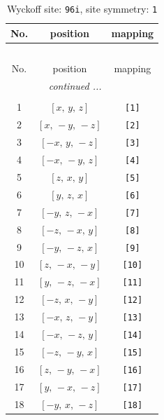 \documentclass[fleqn,8pt]{jsarticle}
\begin{document}
\begin{longtable}{ccc}
\caption{Wyckoff site: {\tt 96i}, site symmetry: {\tt 1}}
 \\
 \hline \hline
No. & position & mapping \\ \hline \endfirsthead

\multicolumn{2}{l}{\tablename\ \thetable{}} \\
 \hline \hline
No. & position & mapping \\ \hline \endhead

 \hline \hline
\multicolumn{2}{r}{\footnotesize\it continued ...} \\ \endfoot

 \hline \hline
\multicolumn{2}{r}{} \\ \endlastfoot

1 & $\left[ x,\, y,\, z \right]$ & {\tt [1]} \\ \hline
2 & $\left[ x,\, - y,\, - z \right]$ & {\tt [2]} \\ \hline
3 & $\left[ - x,\, y,\, - z \right]$ & {\tt [3]} \\ \hline
4 & $\left[ - x,\, - y,\, z \right]$ & {\tt [4]} \\ \hline
5 & $\left[ z,\, x,\, y \right]$ & {\tt [5]} \\ \hline
6 & $\left[ y,\, z,\, x \right]$ & {\tt [6]} \\ \hline
7 & $\left[ - y,\, z,\, - x \right]$ & {\tt [7]} \\ \hline
8 & $\left[ - z,\, - x,\, y \right]$ & {\tt [8]} \\ \hline
9 & $\left[ - y,\, - z,\, x \right]$ & {\tt [9]} \\ \hline
10 & $\left[ z,\, - x,\, - y \right]$ & {\tt [10]} \\ \hline
11 & $\left[ y,\, - z,\, - x \right]$ & {\tt [11]} \\ \hline
12 & $\left[ - z,\, x,\, - y \right]$ & {\tt [12]} \\ \hline
13 & $\left[ - x,\, z,\, - y \right]$ & {\tt [13]} \\ \hline
14 & $\left[ - x,\, - z,\, y \right]$ & {\tt [14]} \\ \hline
15 & $\left[ - z,\, - y,\, x \right]$ & {\tt [15]} \\ \hline
16 & $\left[ z,\, - y,\, - x \right]$ & {\tt [16]} \\ \hline
17 & $\left[ y,\, - x,\, - z \right]$ & {\tt [17]} \\ \hline
18 & $\left[ - y,\, x,\, - z \right]$ & {\tt [18]} \\ \hline

\end{longtable}
\end{document}
